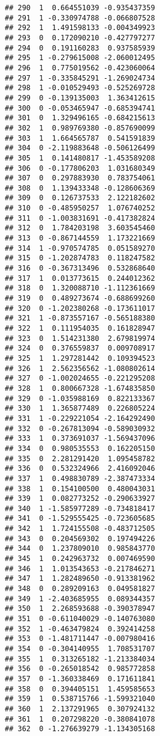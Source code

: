 \documentclass[
]{article}
\begin{document}
\begin{verbatim}
## 290  1  0.664551039 -0.935437359
## 291  1 -0.330974788 -0.066807528
## 292  1  1.491598133 -0.004349923
## 293  0  0.172090210 -0.427797277
## 294  0  0.191160283  0.937585939
## 295  1 -0.279615008 -2.060012495
## 296  1  0.775019562 -0.423060064
## 297  1 -0.335845291 -1.269024734
## 298  1 -0.010529493 -0.525269728
## 299  0 -0.139135003  1.363412615
## 300  0 -0.053465947 -0.685394741
## 301  0  1.329496165 -0.684215613
## 302  1  0.989769380 -0.857690099
## 303  1  1.664565787  0.541591839
## 304  0 -2.119883648 -0.506126499
## 305  1  0.141480817 -1.453589208
## 306  0 -0.177806203  1.031680349
## 307  0  0.297883930  0.783754061
## 308  0  1.139433348 -0.128606369
## 309  0  0.126737533  2.122182602
## 310  0 -0.485950257  1.076740252
## 311  0 -1.003831691 -0.417382824
## 312  0  1.784203198  3.603545460
## 313  0 -0.867144559  1.173221669
## 314  1 -0.970574785  0.051589270
## 315  0 -1.202874783  0.118247582
## 316  0 -0.367313496  0.532868640
## 317  1  0.013773615  0.244012362
## 318  0  1.320088710 -1.112361669
## 319  0  0.489273674 -0.688699260
## 320  0 -1.202380268 -0.173611017
## 321  1 -0.873557167 -0.565188380
## 322  1  0.111954035  0.161828947
## 323  0  1.514231380  2.679819974
## 324  0  0.376559837  0.009708917
## 325  1  1.297281442  0.109394523
## 326  1  2.562356562 -1.080802614
## 327  0 -1.002024655 -0.221295208
## 328  1  0.800667328 -1.674835850
## 329  0 -1.035988169  0.822133367
## 330  1  1.365877489  0.226805224
## 331  1 -0.229221054 -2.164292490
## 332  0 -0.267813094 -0.589030932
## 333  1  0.373691037 -1.569437096
## 334  0  0.980535553  0.162205150
## 335  0  2.281291420  1.095458782
## 336  0  0.532324966  2.416092046
## 337  1  0.498830789 -2.387473334
## 338  1  0.154100500  0.480043031
## 339  1  0.082773252 -0.290633927
## 340  1 -1.585977289 -0.734818417
## 341  0 -1.529555425 -0.723605685
## 342  1  1.724155508 -0.483712505
## 343  0  0.204569302  0.197494226
## 344  0  1.237809010  0.985843770
## 345  1  0.242963732  0.007469590
## 346  1  1.013543653 -0.217846271
## 347  1  1.282489650 -0.913381962
## 348  0  0.289209163  0.049581827
## 349  1 -2.403685955  0.089344357
## 350  1  2.268593688 -0.390378947
## 351  0 -0.611040029 -0.140763080
## 352  1 -0.463479824  0.392414258
## 353  0 -1.481711447 -0.007980416
## 354  0 -0.304140955  1.708531707
## 355  1  0.313265182 -1.213384034
## 356  0 -0.265018542  0.985772858
## 357  0 -1.360338469  0.171611841
## 358  0  0.394405151  1.459585653
## 359  1  0.538715766 -1.599321040
## 360  1  2.137291965  0.307924132
## 361  1  0.207298220 -0.380841078
## 362  0 -1.276639279 -1.134305168

\end{verbatim}
\end{document}
